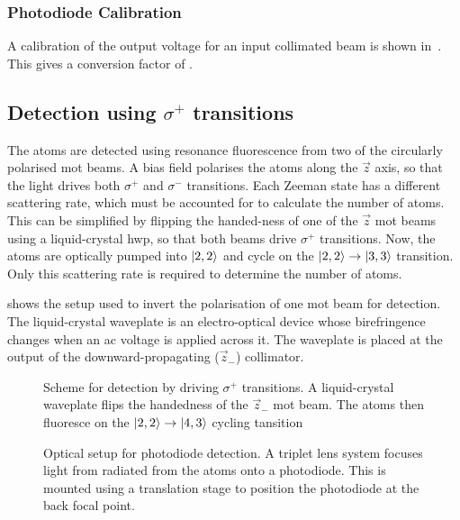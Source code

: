 \subsubsection{Photodiode Calibration}
A calibration of the output voltage for an input collimated beam is
shown in~. This
gives a conversion factor of . 
\subsection{Detection using \(\sigma^+\) transitions}\label{subsec:photodiode_setup}
The atoms are detected using resonance fluorescence from two of the
circularly polarised \ac{mot} beams. A bias field polarises the atoms along the
\(\vec{z}\) axis, so that the light drives both \(\sigma^+\) and \(\sigma^-\)
transitions. Each Zeeman state has a different scattering rate, which
must be accounted for to calculate the number of atoms. This can be
simplified by flipping the handed-ness of
one of the \(\vec{z}\) \ac{mot} beams using a liquid-crystal
\ac{hwp}, so that both beams drive \(\sigma^+\) transitions. Now, the
atoms are optically pumped into \(\ket{2,2}\) and cycle on the
\(\ket{2,2} \rightarrow \ket{3,3}\) transition. Only this scattering
rate is required to determine the number of atoms.
\par\noindent
{} shows the setup used to invert the
polarisation of one \ac{mot} beam for detection. The liquid-crystal waveplate is an electro-optical device whose birefringence changes when an ac voltage is applied across it. The waveplate is placed at the output of the downward-propagating (\(\vec{z}_-\))
collimator. 
  \begin{figure}[!htpb]
    \centering
    \caption{Scheme for detection by driving \(\sigma^+\) transitions. A
      liquid-crystal waveplate flips the handedness of the \(\vec{z}_-\) \ac{mot} beam. The atoms then fluoresce on the \(\ket{2,2} \rightarrow \ket{4,3}\) cycling tansition}\label{fig:detection_scheme}
\end{figure}
\begin{figure}[!htbp] 
  \centering \fontsize{18pt}{18pt}
	\resizebox{0.7\textwidth}{!}{}
	\caption[Optical setup for Photodiode Detection]{Optical setup for photodiode
		detection. A triplet lens system focuses light from radiated from the atoms
		onto a photodiode. This is mounted using a translation stage to
  position the photodiode at the back focal point.}
  \label{fig:photodiode_optics}
\end{figure}
